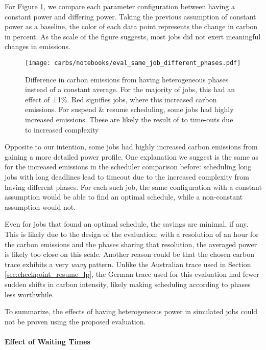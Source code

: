 \newpage
For Figure \ref{fig:different_phases_no_effect_lol}, we compare each parameter configuration between having a constant power and differing power. Taking the previous assumption of constant power as a baseline, the color of each data point represents the change in carbon in percent. As the scale of the figure suggests, most jobs did not exert meaningful changes in emissions. 

\begin{figure}[H]
    \texttt{[image: carbs/notebooks/eval\_same\_job\_different\_phases.pdf]}
    \caption[short]{Difference in carbon emissions from having heterogeneous phases instead of a constant average. For the majority of jobs, this had an effect of ±1\%. Red signifies jobs, where this increased carbon emissions. For suspend \& resume scheduling, some jobs had highly increased emissions. These are likely the result of to time-outs due to increased complexity}

    \label{fig:different_phases_no_effect_lol}
\end{figure}

Opposite to our intention, some jobs had highly increased carbon emissions from gaining a more detailed power profile.
One explanation we suggest is the same as for the increased emissions in the scheduler comparison before: scheduling long jobs with long deadlines lead to timeout due to the increased complexity from having different phases. 
For each such job, the same configuration with a constant assumption would be able to find an optimal schedule, while a non-constant assumption would not.

Even for jobs that found an optimal schedule, the savings are minimal, if any. 
This is likely due to the design of the evaluation: with a resolution of an hour for the carbon emissions and the phases sharing that resolution, the averaged power is likely too close on this scale. Another reason could be that the chosen carbon trace exhibits a very \emph{wavy} pattern. Unlike the Australian trace used in Section \ref{sec:checkpoint_resume_lp}, the German trace used for this evaluation had fewer sudden shifts in carbon intensity, likely making scheduling according to phases less worthwhile.

To summarize, the effects of having heterogeneous power in simulated jobs could not be proven using the proposed evaluation.

\paragraph{Effect of Waiting Times}

